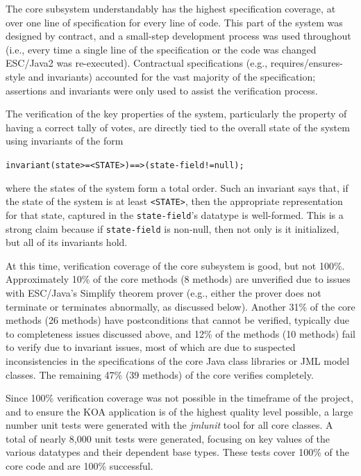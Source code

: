 \documentclass{llncs}
\begin{document}
The core subsystem understandably has the highest specification
coverage, at over one line of specification for every line of code.
This part of the system was designed by contract, and a small-step
development process was used throughout (i.e., every time a single line
of the specification or the code was changed ESC/Java2 was
re-executed).  Contractual specifications (e.g., requires/ensures-style
and invariants) accounted for the vast majority of the specification;
assertions and invariants were only used to assist the verification
process.

The verification of the key properties of the system, particularly the
property of having a correct tally of votes, are directly tied to the
overall state of the system using invariants of the form
\begin{alltt}
     invariant (state >= <STATE>) ==> (state-field != null);
\end{alltt}
where the states of the system form a total order.  Such an invariant
says that, if the state of the system is at least \texttt{<STATE>},
then the appropriate representation for that state, captured in the
\texttt{state-field}'s datatype is well-formed.  This is a strong
claim because if \texttt{state-field} is non-null, then not only is it
initialized, but all of its invariants hold.

At this time, verification coverage of the core subsystem is good, but
not 100\%.  Approximately 10\% of the core methods (8 methods) are
unverified due to issues with ESC/Java's Simplify theorem prover
(e.g., either the prover does not terminate or terminates abnormally,
as discussed below).  Another 31\% of the core methods (26 methods)
have postconditions that cannot be verified, typically due to
completeness issues discussed above, and 12\% of the methods (10
methods) fail to verify due to invariant issues, most of which are due
to suspected inconsistencies in the specifications of the core Java
class libraries or JML model classes.  The remaining 47\% (39 methods)
of the core verifies completely.

Since 100\% verification coverage was not possible in the timeframe of
the project, and to ensure the KOA application is of the highest
quality level possible, a large number unit tests were generated with
the \emph{jmlunit} tool for all core classes.  A total of nearly 8,000
unit tests were generated, focusing on key values of the various
datatypes and their dependent base types.  These tests cover 100\% of
the core code and are 100\% successful.
\end{document}
